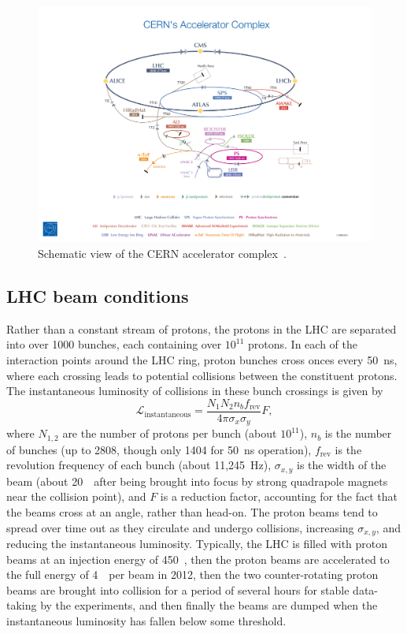 \begin{figure}[ht]
  \centering
  \includegraphics[width=\textwidth, clip=true, trim=15cm 0 15cm 10cm]
    {figs/lhc/accelerator_complex.jpg}
  \caption{
    Schematic view of the CERN accelerator complex~\cite{Marcastel:1621583}.
  }
  \label{fig:cern_complex}
\end{figure}

\FloatBarrier
\subsection{LHC beam conditions}
\label{sec:beam_conditions}

Rather than a constant stream of protons, the protons in the LHC are separated
into over 1000 bunches, each containing over $10^{11}$ protons.
In each of the interaction points around the LHC ring, proton bunches cross
onces every 50~ns, where each crossing leads to potential collisions between
the constituent protons.
The instantaneous luminosity of collisions in these bunch crossings is given by
\begin{equation}
  \mathcal{L}_\mathrm{instantaneous} =
  \frac{N_{1}N_{2} n_b f_\mathrm{rev}}
  {4\pi \sigma_{x} \sigma_{y}}
  F,
\end{equation}
where $N_{1,2}$ are the number of protons per bunch (about $10^{11}$),
$n_b$ is the number of bunches (up to 2808, though only 1404 for
50~ns operation), $f_\mathrm{rev}$ is the revolution frequency of each
bunch (about 11,245~Hz),
$\sigma_{x,y}$ is the width of the beam (about 20~\um\ after being brought
into focus by strong quadrapole magnets near the collision point),
and $F$ is a reduction factor, accounting for the fact that the beams cross
at an angle, rather than head-on.
The proton beams tend to spread over time out as they circulate and undergo
collisions, increasing $\sigma_{x,y}$, and reducing the instantaneous
luminosity.
Typically, the LHC is filled with proton beams at an injection energy of
450~\GeV, then the proton beams are accelerated to the full energy of
4~\TeV\ per beam in 2012, then the two counter-rotating proton beams are
brought into collision for a period of several hours for stable data-taking by
the experiments, and then finally the beams are dumped when the instantaneous
luminosity has fallen below some threshold.

